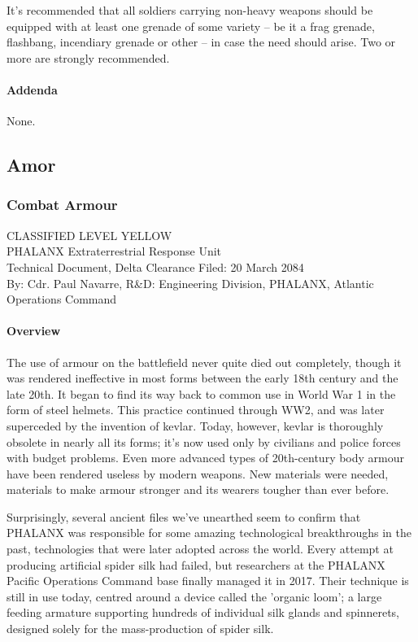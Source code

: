 It's recommended that all soldiers carrying non-heavy weapons should be equipped with at least one grenade of some variety -- be it a frag grenade, flashbang, incendiary grenade or other -- in case the need should arise. Two or more are strongly recommended.
\paragraph*{Addenda}
None. 
\subsection{Amor}
\subsubsection*{Combat Armour}
CLASSIFIED LEVEL YELLOW\\
PHALANX Extraterrestrial Response Unit\\
Technical Document, Delta Clearance
Filed: 20 March 2084\\
By: Cdr. Paul Navarre, R&D: Engineering Division, PHALANX, Atlantic Operations Command\\
\paragraph*{Overview}
The use of armour on the battlefield never quite died out completely, though it was rendered ineffective in most forms between the early 18th century and the late 20th. It began to find its way back to common use in World War 1 in the form of steel helmets. This practice continued through WW2, and was later superceded by the invention of kevlar. Today, however, kevlar is thoroughly obsolete in nearly all its forms; it's now used only by civilians and police forces with budget problems. Even more advanced types of 20th-century body armour have been rendered useless by modern weapons. New materials were needed, materials to make armour stronger and its wearers tougher than ever before.

Surprisingly, several ancient files we've unearthed seem to confirm that PHALANX was responsible for some amazing technological breakthroughs in the past, technologies that were later adopted across the world. Every attempt at producing artificial spider silk had failed, but researchers at the PHALANX Pacific Operations Command base finally managed it in 2017. Their technique is still in use today, centred around a device called the 'organic loom'; a large feeding armature supporting hundreds of individual silk glands and spinnerets, designed solely for the mass-production of spider silk.

